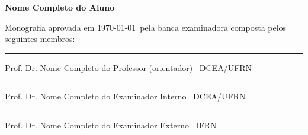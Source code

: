 
%
%
%
%

\begin{titlepage}

\begin{center}

\LARGE

\textbf{\titulo}

\vfill

\Large

\textbf{Nome Completo do Aluno}

\end{center}

\vfill

\noindent

Monografia aprovada em \today\ pela banca examinadora composta pelos seguintes
membros:

\begin{center}

\vspace{1.5cm}\rule{0.95\linewidth}{1pt}
\parbox{0.9\linewidth}{%
Prof. Dr. Nome Completo do Professor (orientador) \dotfill\ DCEA/UFRN}

\vspace{1.5cm}\rule{0.95\linewidth}{1pt}
\parbox{0.9\linewidth}{%
Prof. Dr. Nome Completo do Examinador Interno \dotfill\ DCEA/UFRN}

\vspace{1.5cm}\rule{0.95\linewidth}{1pt}
\parbox{0.9\linewidth}{%
Prof. Dr. Nome Completo do Examinador Externo \dotfill\ IFRN}

\end{center}

\end{titlepage}
